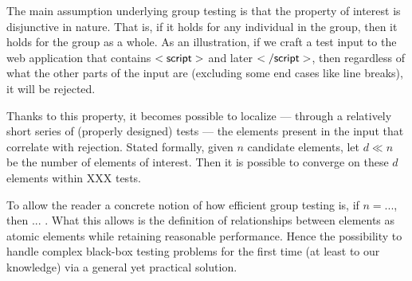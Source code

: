 The main assumption underlying group testing is that the property of interest is disjunctive in nature. That is, if it holds for any individual in the group, then it holds for the group as a whole. As an illustration, if we craft a test input to the web application that contains ${\sf <script>}$ and later ${\sf </script>}$, then regardless of what the other parts of the input are (excluding some end cases like line breaks), it will be rejected.

Thanks to this property, it becomes possible to localize --- through a relatively short series of (properly designed) tests --- the elements present in the input that correlate with rejection. Stated formally, given $n$ candidate elements, let $d \ll n$ be the number of elements of interest. Then it is possible to converge on these $d$ elements within XXX tests. 

To allow the reader a concrete notion of how efficient group testing is, if $n=...$, then ... . What this allows is the definition of relationships between elements as atomic elements while retaining reasonable performance. Hence the possibility to handle complex black-box testing problems for the first time (at least to our knowledge) via a general yet practical solution.